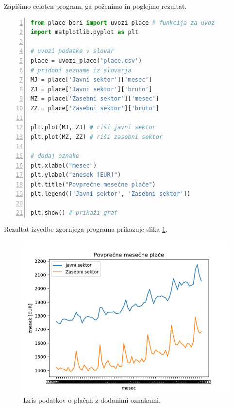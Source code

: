 Zapišimo celoten program, ga poženimo in poglejmo rezultat. 
\begin{lstlisting}[language=Python, showstringspaces=false,numbers=left]
from place_beri import uvozi_place # funkcija za uvoz
import matplotlib.pyplot as plt

# uvozi podatke v slovar
place = uvozi_place('place.csv')
# pridobi sezname iz slovarja
MJ = place['Javni sektor']['mesec']
ZJ = place['Javni sektor']['bruto']
MZ = place['Zasebni sektor']['mesec']
ZZ = place['Zasebni sektor']['bruto']

plt.plot(MJ, ZJ) # riši javni sektor
plt.plot(MZ, ZZ) # riši zasebni sektor

# dodaj oznake
plt.xlabel("mesec")
plt.ylabel("znesek [EUR]")
plt.title("Povprečne mesečne plače")
plt.legend(['Javni sektor', 'Zasebni sektor'])

plt.show() # prikaži graf
\end{lstlisting}
Rezultat izvedbe zgornjega programa prikazuje slika \ref{img:plt4}.
\begin{figure}
    \includegraphics[width=\linewidth]{img/plt4.png}
    \caption{Izris podatkov o plačah z dodanimi oznakami.}
    \label{img:plt4}
\end{figure}

